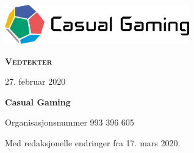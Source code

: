 \begin{titlepage}
    \centering
    \vspace*{1cm}
    \includegraphics[width=8cm]{innhold/logo-farger-tekst.png}\par
    \vspace*{4cm}
    {\rmfamily\Huge\bfseries\scshape Vedtekter}\par
    \vspace*{1cm}
    {27. februar 2020}\par
    \vfill
    {\bfseries Casual Gaming}\par
    \vspace*{0.5cm}
    {Organisasjonsnummer 993 396 605}\par
    \vspace*{0.5cm}
    {Med redaksjonelle endringer fra 17. mars 2020.}\par
\end{titlepage}
